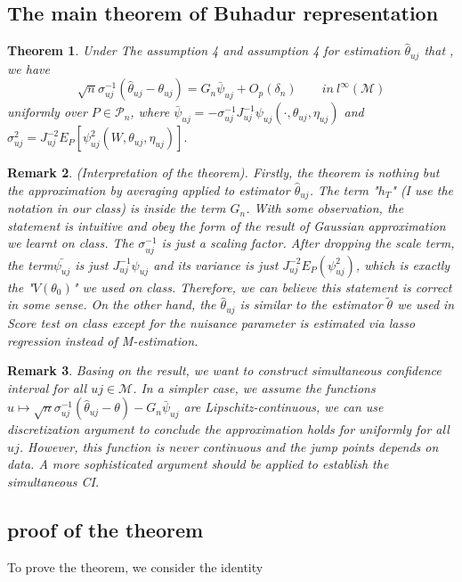 \documentclass{article}
\newtheorem{theorem}{Theorem}[section]
\newtheorem{remark}[theorem]{Remark}
\begin{document}
\subsection{The main theorem of Buhadur representation}
\begin{theorem}
    Under The assumption 4 and assumption 4 for estimation $\hat{\theta}_{uj}$ that    , we have 
    \begin{equation}
        \sqrt{n}\sigma_{uj}^{-1}(\hat{\theta}_{uj}-\theta_{uj})=G_n \bar{\psi}_{uj} + O_p(\delta_n) \qquad in\ l^{\infty}(\mathcal{M}) 
    \end{equation}
    uniformly over $P\in \mathcal{P}_n$, where $\bar{\psi}_{uj}=-\sigma_{uj}^{-1}J^{-1}_{uj}\psi_{uj}(\cdot,\theta_{uj},\eta_{uj})$ and $\sigma_{uj}^2=J^{-2}_{uj}E_P[\psi_{uj}^2(W,\theta_{uj},\eta_{uj})].$
\end{theorem}
\begin{remark}
    (Interpretation of the theorem). Firstly, the theorem is nothing but the approximation by averaging applied to estimator $\hat{\theta}_{uj}$. The term "$h_T$" (I use the notation in our class) is inside the term $G_n$. With some observation, the statement is intuitive and obey the form of the result of Gaussian approximation we learnt on class. The $\sigma_{uj}^{-1}$ is just a scaling factor. After dropping the scale term, the term$\bar{\psi_{uj}} $ is just $J^{-1}_{uj}\psi_{uj}$ and its variance is just $J_{uj}^{-2}E_P(\psi_{uj}^2)$, which is exactly the "$V(\theta_0)$" we used on class. Therefore, we can believe this statement is correct in some sense. On the other hand, the $\hat{\theta}_{uj} $ is similar to the estimator $\tilde{\theta}$ we  used in Score test on class except for the nuisance parameter is estimated via lasso regression instead of M-estimation.
\end{remark}
\begin{remark}
    Basing on the result, we want to construct simultaneous confidence interval for all $uj\in \mathcal{M}$. In a simpler case, we assume the functions $u\mapsto \sqrt{n}\sigma_{uj}^{-1} (\hat{\theta}_{uj}-\theta)-G_n\bar{\psi}_{uj}$ are Lipschitz-continuous, we can use discretization argument to conclude the approximation holds for uniformly for all $uj$. However, this function is never continuous and the jump points depends on data. A more sophisticated argument should be applied to establish the simultaneous CI. 
\end{remark}

\subsection{proof of the theorem}
To prove the theorem, we consider the identity 
\end{document}
